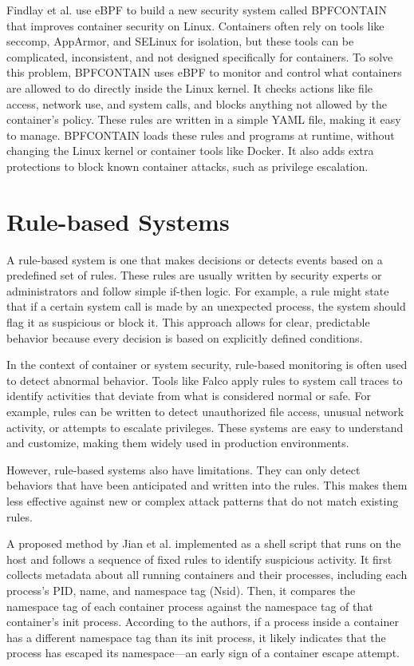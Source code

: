 \begin{doublespace}
Findlay et al. \cite{findlay2021bpfcontain} use eBPF to build a new security system called BPFCONTAIN that improves container security on Linux. Containers often rely on tools like seccomp, AppArmor, and SELinux for isolation, but these tools can be complicated, inconsistent, and not designed specifically for containers. To solve this problem, BPFCONTAIN uses eBPF to monitor and control what containers are allowed to do directly inside the Linux kernel. It checks actions like file access, network use, and system calls, and blocks anything not allowed by the container’s policy. These rules are written in a simple YAML file, making it easy to manage. BPFCONTAIN loads these rules and programs at runtime, without changing the Linux kernel or container tools like Docker. It also adds extra protections to block known container attacks, such as privilege escalation.



\section{Rule-based Systems}

A rule-based system is one that makes decisions or detects events based on a predefined set of rules. These rules are usually written by security experts or administrators and follow simple if-then logic. For example, a rule might state that if a certain system call is made by an unexpected process, the system should flag it as suspicious or block it. This approach allows for clear, predictable behavior because every decision is based on explicitly defined conditions.

In the context of container or system security, rule-based monitoring is often used to detect abnormal behavior. Tools like Falco apply rules to system call traces to identify activities that deviate from what is considered normal or safe. For example, rules can be written to detect unauthorized file access, unusual network activity, or attempts to escalate privileges. These systems are easy to understand and customize, making them widely used in production environments.

However, rule-based systems also have limitations. They can only detect behaviors that have been anticipated and written into the rules. This makes them less effective against new or complex attack patterns that do not match existing rules.

A proposed method by Jian et al. \cite{jian2017defense} implemented as a shell script that runs on the host and follows a sequence of fixed rules to identify suspicious activity. It first collects metadata about all running containers and their processes, including each process’s PID, name, and namespace tag (Nsid). Then, it compares the namespace tag of each container process against the namespace tag of that container’s init process. According to the authors, if a process inside a container has a different namespace tag than its init process, it likely indicates that the process has escaped its namespace—an early sign of a container escape attempt.


\end{doublespace}
